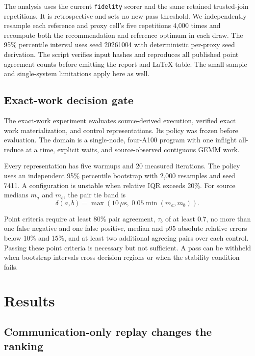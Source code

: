 \documentclass[10pt,twocolumn]{article}
\newcommand{\us}{\,\mu\mathrm{s}}
\begin{document}
The analysis uses the current \texttt{fidelity} scorer and the same retained
trusted-join repetitions. It is retrospective and sets no new pass threshold.
We independently resample each reference and proxy cell's five repetitions
4,000 times and recompute both the recommendation and reference optimum in
each draw. The 95\% percentile interval uses seed 20261004 with deterministic
per-proxy seed derivation. The script verifies input hashes and reproduces all
published point agreement counts before emitting the report and LaTeX table.
The small sample and single-system limitations apply here as well.

\subsection{Exact-work decision gate}
\label{sec:gate-method}

The exact-work experiment evaluates source-derived execution, verified exact
work materialization, and control representations. Its policy was frozen
before evaluation. The domain is a single-node, four-A100 program with one
inflight all-reduce at a time, explicit waits, and source-observed contiguous
GEMM work.

Every representation has five warmups and 20 measured iterations. The policy
uses an independent 95\% percentile bootstrap with 2,000 resamples and seed
7411. A configuration is unstable when relative IQR exceeds 20\%. For source
medians $m_a$ and $m_b$, the pair tie band is
\begin{equation}
  \delta(a,b)=\max(10\us,\;0.05\min(m_a,m_b)).
\end{equation}

Point criteria require at least 80\% pair agreement, $\tau_b$ of at least 0.7,
no more than one false negative and one false positive, median and p95 absolute
relative errors below 10\% and 15\%, and at least two additional agreeing pairs
over each control. Passing these point criteria is necessary but not
sufficient. A pass can be withheld when bootstrap intervals cross decision
regions or when the stability condition fails.

\section{Results}

\subsection{Communication-only replay changes the ranking}
\end{document}
